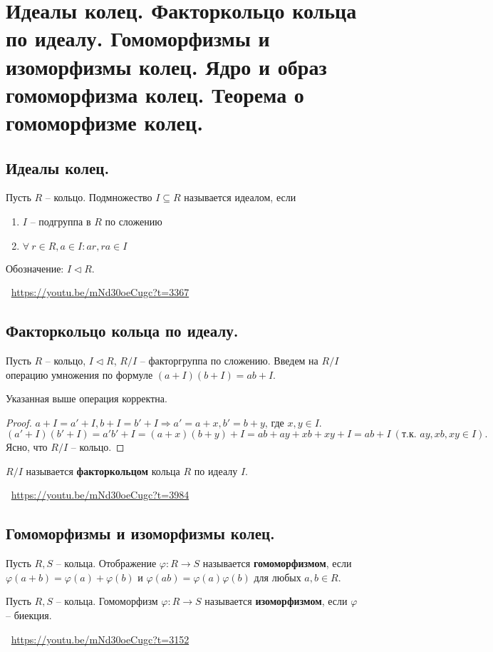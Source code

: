 \section{Идеалы колец. Факторкольцо кольца по идеалу. Гомоморфизмы и изоморфизмы колец. Ядро и образ гомоморфизма колец. Теорема о гомоморфизме колец.}

\subsection{Идеалы колец.}
\begin{definition}
    Пусть $R$ -- кольцо. Подмножество $I \subseteq R$ называется идеалом, если
    \begin{enumerate}
        \item $I$ -- подгруппа в $R$ по сложению
        \item $\forall \> r \in R, a \in I : ar, ra \in I$
    \end{enumerate}
    Обозначение: $I \triangleleft R$.
\end{definition}
\large \faYoutube \normalsize $\>$ \url{https://youtu.be/mNd30oeCugc?t=3367}

\subsection{Факторкольцо кольца по идеалу.}
Пусть $R$ -- кольцо, $I \triangleleft R$, $R / I$ -- факторгруппа по сложению. Введем на $R / I$ операцию умножения по формуле $(a + I)(b + I) = ab + I$.
\begin{statement}
    Указанная выше операция корректна.
    \begin{proof}
        $a + I = a' + I, b + I = b' + I \Rightarrow a' = a + x, b' = b + y$, где $x,y \in I$.
        \[
            (a' + I)(b' + I) = a'b' + I = (a + x)(b + y) + I = ab + ay + xb + xy + I = ab + I \> (\text{т.к. } ay, xb, xy \in I).
        \]
        Ясно, что $R / I$ -- кольцо.
    \end{proof}
\end{statement}
\begin{definition}
    $R / I$ называется \textbf{факторкольцом} кольца $R$ по идеалу $I$.
\end{definition}
\large \faYoutube \normalsize $\>$ \url{https://youtu.be/mNd30oeCugc?t=3984}

\subsection{Гомоморфизмы и изоморфизмы колец.}
\begin{definition}
    Пусть $R, S$ -- кольца. Отображение $\varphi : R \to S$ называется \textbf{гомоморфизмом}, если $\varphi(a + b) = \varphi(a) + \varphi(b)$ и $\varphi(ab) = \varphi(a)\varphi(b)$ для любых $a, b \in R$.
\end{definition}
\begin{definition}
    Пусть $R, S$ -- кольца. Гомоморфизм $\varphi : R \to S$ называется \textbf{изоморфизмом}, если $\varphi$ -- биекция.
\end{definition}
\large \faYoutube \normalsize $\>$ \url{https://youtu.be/mNd30oeCugc?t=3152}

